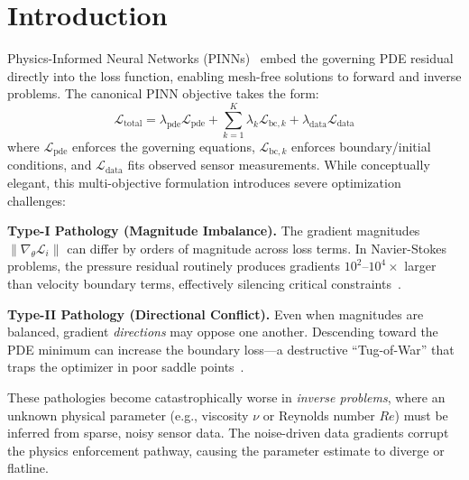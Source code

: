 \documentclass[conference]{IEEEtran}
\begin{document}
\section{Introduction}
\label{sec:intro}

Physics-Informed Neural Networks (PINNs)~\cite{b1} embed the governing PDE residual directly into the loss function, enabling mesh-free solutions to forward and inverse problems. The canonical PINN objective takes the form:
\begin{equation}
    \mathcal{L}_{\text{total}} = \lambda_{\text{pde}} \mathcal{L}_{\text{pde}} + \sum_{k=1}^{K} \lambda_{k} \mathcal{L}_{\text{bc},k} + \lambda_{\text{data}} \mathcal{L}_{\text{data}}
    \label{eq:total_loss}
\end{equation}
where $\mathcal{L}_{\text{pde}}$ enforces the governing equations, $\mathcal{L}_{\text{bc},k}$ enforces boundary/initial conditions, and $\mathcal{L}_{\text{data}}$ fits observed sensor measurements. While conceptually elegant, this multi-objective formulation introduces severe optimization challenges:

\textbf{Type-I Pathology (Magnitude Imbalance).} The gradient magnitudes $\|\nabla_\theta \mathcal{L}_i\|$ can differ by orders of magnitude across loss terms. In Navier-Stokes problems, the pressure residual routinely produces gradients $10^2$--$10^4\times$ larger than velocity boundary terms, effectively silencing critical constraints~\cite{b4}.

\textbf{Type-II Pathology (Directional Conflict).} Even when magnitudes are balanced, gradient \emph{directions} may oppose one another. Descending toward the PDE minimum can increase the boundary loss---a destructive ``Tug-of-War'' that traps the optimizer in poor saddle points~\cite{b3}.

These pathologies become catastrophically worse in \emph{inverse problems}, where an unknown physical parameter (e.g., viscosity $\nu$ or Reynolds number $Re$) must be inferred from sparse, noisy sensor data. The noise-driven data gradients corrupt the physics enforcement pathway, causing the parameter estimate to diverge or flatline.
\end{document}
